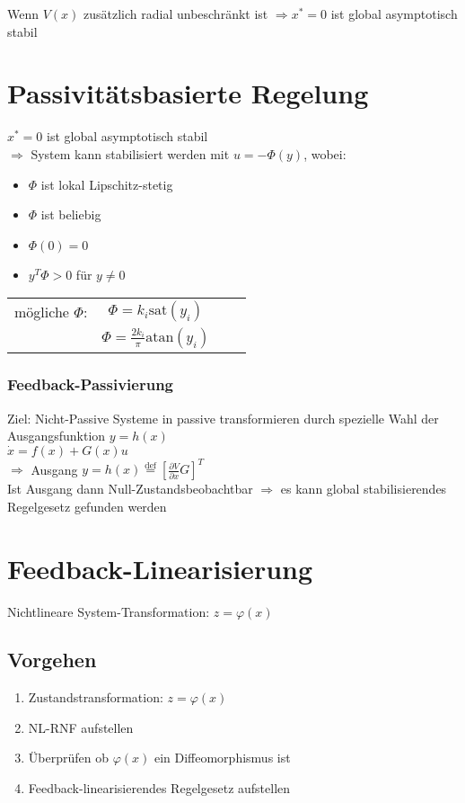 \documentclass[6pt,a4paper,fleqn]{scrartcl}
\begin{document}
\begin{multicols*}{4}
Wenn $V(x)$ zusätzlich radial unbeschränkt ist $\Rightarrow x^* = 0$ ist global asymptotisch stabil


\section{Passivitätsbasierte Regelung}
$x^* = 0$ ist global asymptotisch stabil\\
$\Rightarrow$ System kann stabilisiert werden mit $u = -\Phi(y)$, wobei:
\begin{itemize}
  \item $\Phi$ ist lokal Lipschitz-stetig
  \item $\Phi$ ist beliebig
  \item $\Phi(0) = 0$
  \item $y^T \Phi > 0$ für $y \neq 0$
\end{itemize}

\begin{tabular}{cccc}
mögliche $\Phi$:  & $\Phi = k_i \text{sat}(y_i)$ & \\
                  & $\Phi = \frac{2 k_i}{\pi}\text{atan}(y_i)$ &
\end{tabular}

\subsubsection*{Feedback-Passivierung}
Ziel: Nicht-Passive Systeme in passive transformieren durch spezielle Wahl der Ausgangsfunktion $y=h(x)$ \\
$\dot{x} = f(x) + G(x)u$ \\
$\Rightarrow$ Ausgang $y = h(x) \overset{\text{def}}{=} \left[ \frac{\partial V}{\partial x} G \right]^T$ \\
Ist Ausgang dann Null-Zustandsbeobachtbar $\Rightarrow$ es kann global stabilisierendes Regelgesetz gefunden werden


\section{Feedback-Linearisierung}
Nichtlineare System-Transformation: $z = \varphi (x)$

\subsection{Vorgehen}
\begin{enumerate}
  \item Zustandstransformation: $z = \varphi(x)$
  \item NL-RNF aufstellen
  \item Überprüfen ob $\varphi(x)$ ein Diffeomorphismus ist
  \item Feedback-linearisierendes Regelgesetz aufstellen
\end{enumerate}


\end{multicols*}
\end{document}
